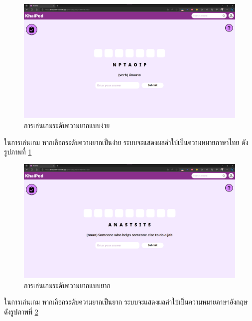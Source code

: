 \documentclass[12pt,oneside,openright,a4paper]{cpe-thai-project}
\begin{document}
\begin{figure}[!h]\centering
	\includegraphics[width=\textwidth, keepaspectratio=true]{image/chap4/Final/game easy.png}
	\caption{{การเล่นเกมระดับความยากแบบง่าย}}\label{fig:chap4FinGameEasy}
\end{figure}
\hspace{1cm}
ในการเล่นเกม หากเลือกระดับความยากเป็นง่าย ระบบจะแสดงผลคำใบ้เป็นความหมายภาษาไทย
ดังรูปภาพที่ \ref{fig:chap4FinGameEasy}

\pagebreak
\begin{figure}[!h]\centering
	\includegraphics[width=\textwidth, keepaspectratio=true]{image/chap4/Final/game hard.png}
	\caption{{การเล่นเกมระดับความยากแบบยาก}}\label{fig:chap4FinGameHard}
\end{figure}
\hspace{1cm}
ในการเล่นเกม หากเลือกระดับความยากเป็นยาก ระบบจะแสดงผลคำใบ้เป็นความหมายภาษาอังกฤษ
ดังรูปภาพที่ \ref{fig:chap4FinGameHard}
\end{document}
